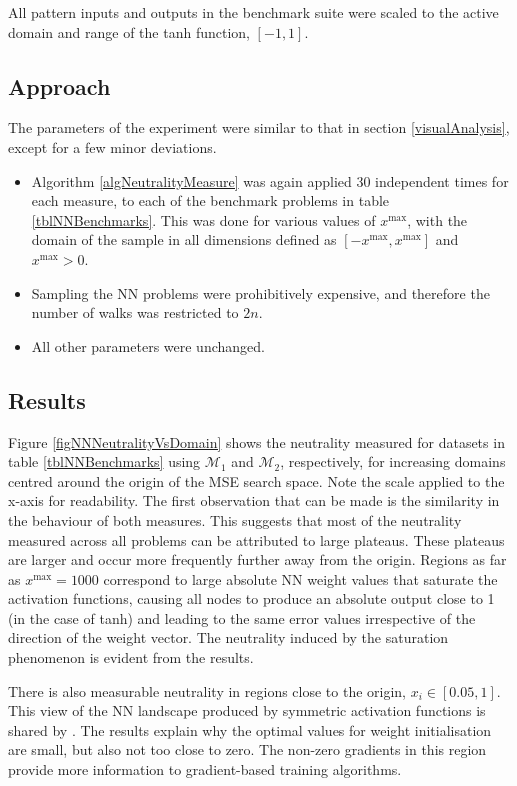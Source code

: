 \documentclass[conference]{IEEEtran}
\begin{document}
All pattern inputs and outputs in the benchmark suite were scaled to the active domain and range of the tanh function, $[-1,1]$.
	
\subsection{Approach}
\label{nnApproach}
The parameters of the experiment were similar to that in section \ref{visualAnalysis}, except for a few minor deviations.

\begin{itemize}
	\item Algorithm \ref{algNeutralityMeasure} was again applied 30 independent times for each measure, to each of the benchmark problems in table \ref{tblNNBenchmarks}. This was done for various values of $x^{\text{max}}$, with the domain of the sample in all dimensions defined as $[-x^{\text{max}}, x^{\text{max}}]$ and $x^{\text{max}} > 0$.
	\item Sampling the NN problems were prohibitively expensive, and therefore the number of walks was restricted to $2n$.
	\item All other parameters were unchanged.
\end{itemize}

\subsection{Results}
\label{nnResults}

Figure \ref{figNNNeutralityVsDomain} shows the neutrality measured for datasets in table \ref{tblNNBenchmarks} using ${\mathcal{M}_1}$ and ${\mathcal{M}_2}$, respectively, for increasing domains centred around the origin of the MSE search space. Note the scale applied to the x-axis for readability. The first observation that can be made is the similarity in the behaviour of both measures. This suggests that most of the neutrality measured across all problems can be attributed to large plateaus. These plateaus are larger and occur more frequently further away from the origin. Regions as far as $x^{\text{max}} = 1000$ correspond to large absolute NN weight values that saturate the activation functions, causing all nodes to produce an absolute output close to 1 (in the case of tanh) and leading to the same error values irrespective of the direction of the weight vector. The neutrality induced by the saturation phenomenon is evident from the results.

There is also measurable neutrality in regions close to the origin, $x_i \in [0.05, 1]$. This view of the NN landscape produced by symmetric activation functions is shared by \citet{lecun2012efficient}. The results explain why the optimal values for weight initialisation are small, but also not too close to zero. The non-zero gradients in this region provide more information to gradient-based training algorithms.
\end{document}

